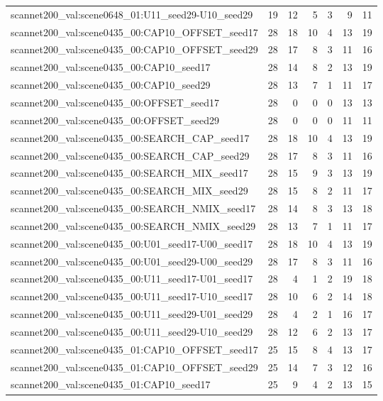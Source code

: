 \begin{table}[t]
\begin{tabular}{lrrrrrr}
scannet200\_val:scene0648\_01:U11\_seed29-U10\_seed29 & 19 & 12 & 5 & 3 & 9 & 11 \\
scannet200\_val:scene0435\_00:CAP10\_OFFSET\_seed17 & 28 & 18 & 10 & 4 & 13 & 19 \\
scannet200\_val:scene0435\_00:CAP10\_OFFSET\_seed29 & 28 & 17 & 8 & 3 & 11 & 16 \\
scannet200\_val:scene0435\_00:CAP10\_seed17 & 28 & 14 & 8 & 2 & 13 & 19 \\
scannet200\_val:scene0435\_00:CAP10\_seed29 & 28 & 13 & 7 & 1 & 11 & 17 \\
scannet200\_val:scene0435\_00:OFFSET\_seed17 & 28 & 0 & 0 & 0 & 13 & 13 \\
scannet200\_val:scene0435\_00:OFFSET\_seed29 & 28 & 0 & 0 & 0 & 11 & 11 \\
scannet200\_val:scene0435\_00:SEARCH\_CAP\_seed17 & 28 & 18 & 10 & 4 & 13 & 19 \\
scannet200\_val:scene0435\_00:SEARCH\_CAP\_seed29 & 28 & 17 & 8 & 3 & 11 & 16 \\
scannet200\_val:scene0435\_00:SEARCH\_MIX\_seed17 & 28 & 15 & 9 & 3 & 13 & 19 \\
scannet200\_val:scene0435\_00:SEARCH\_MIX\_seed29 & 28 & 15 & 8 & 2 & 11 & 17 \\
scannet200\_val:scene0435\_00:SEARCH\_NMIX\_seed17 & 28 & 14 & 8 & 3 & 13 & 18 \\
scannet200\_val:scene0435\_00:SEARCH\_NMIX\_seed29 & 28 & 13 & 7 & 1 & 11 & 17 \\
scannet200\_val:scene0435\_00:U01\_seed17-U00\_seed17 & 28 & 18 & 10 & 4 & 13 & 19 \\
scannet200\_val:scene0435\_00:U01\_seed29-U00\_seed29 & 28 & 17 & 8 & 3 & 11 & 16 \\
scannet200\_val:scene0435\_00:U11\_seed17-U01\_seed17 & 28 & 4 & 1 & 2 & 19 & 18 \\
scannet200\_val:scene0435\_00:U11\_seed17-U10\_seed17 & 28 & 10 & 6 & 2 & 14 & 18 \\
scannet200\_val:scene0435\_00:U11\_seed29-U01\_seed29 & 28 & 4 & 2 & 1 & 16 & 17 \\
scannet200\_val:scene0435\_00:U11\_seed29-U10\_seed29 & 28 & 12 & 6 & 2 & 13 & 17 \\
scannet200\_val:scene0435\_01:CAP10\_OFFSET\_seed17 & 25 & 15 & 8 & 4 & 13 & 17 \\
scannet200\_val:scene0435\_01:CAP10\_OFFSET\_seed29 & 25 & 14 & 7 & 3 & 12 & 16 \\
scannet200\_val:scene0435\_01:CAP10\_seed17 & 25 & 9 & 4 & 2 & 13 & 15 \\

\end{tabular}
\end{table}
